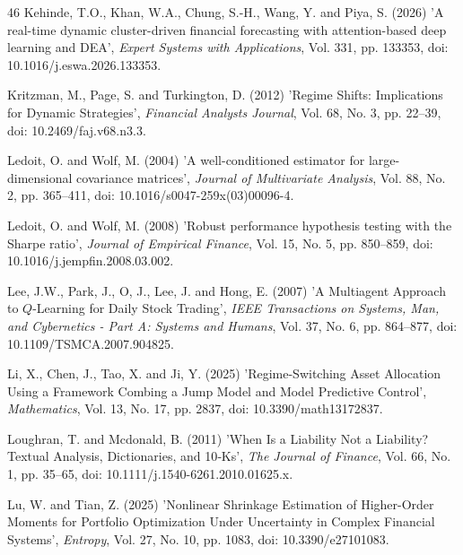 \documentclass{singlecol-new}
\theoremstyle{TH}{
\newtheorem{lemma}{Lemma}
\newtheorem{theorem}[lemma]{Theorem}
\newtheorem{corrolary}[lemma]{Corrolary}
\newtheorem{conjecture}[lemma]{Conjecture}
\newtheorem{proposition}[lemma]{Proposition}
\newtheorem{claim}[lemma]{Claim}
\newtheorem{stheorem}[lemma]{Wrong Theorem}
\newtheorem{algorithm}{Algorithm}
}
\theoremstyle{THrm}{
\newtheorem{definition}{Definition}[section]
\newtheorem{question}{Question}[section]
\newtheorem{remark}{Remark}
\newtheorem{scheme}{Scheme}
}
\theoremstyle{THhit}{
\newtheorem{case}{Case}[section]
}
\begin{document}
\begin{thebibliography}{46}
Kehinde, T.O., Khan, W.A., Chung, S.-H., Wang, Y. and Piya, S. (2026) 'A real-time dynamic cluster-driven financial forecasting with attention-based deep learning and DEA', {\it Expert Systems with Applications}, Vol. 331, pp. 133353, doi: 10.1016/j.eswa.2026.133353.

Kritzman, M., Page, S. and Turkington, D. (2012) 'Regime Shifts: Implications for Dynamic Strategies', {\it Financial Analysts Journal}, Vol. 68, No. 3, pp. 22--39, doi: 10.2469/faj.v68.n3.3.

Ledoit, O. and Wolf, M. (2004) 'A well-conditioned estimator for large-dimensional covariance matrices', {\it Journal of Multivariate Analysis}, Vol. 88, No. 2, pp. 365--411, doi: 10.1016/s0047-259x(03)00096-4.

Ledoit, O. and Wolf, M. (2008) 'Robust performance hypothesis testing with the Sharpe ratio', {\it Journal of Empirical Finance}, Vol. 15, No. 5, pp. 850--859, doi: 10.1016/j.jempfin.2008.03.002.

Lee, J.W., Park, J., O, J., Lee, J. and Hong, E. (2007) 'A Multiagent Approach to $Q$-Learning for Daily Stock Trading', {\it IEEE Transactions on Systems, Man, and Cybernetics - Part A: Systems and Humans}, Vol. 37, No. 6, pp. 864--877, doi: 10.1109/TSMCA.2007.904825.

Li, X., Chen, J., Tao, X. and Ji, Y. (2025) 'Regime-Switching Asset Allocation Using a Framework Combing a Jump Model and Model Predictive Control', {\it Mathematics}, Vol. 13, No. 17, pp. 2837, doi: 10.3390/math13172837.

Loughran, T. and Mcdonald, B. (2011) 'When Is a Liability Not a Liability? Textual Analysis, Dictionaries, and 10‐Ks', {\it The Journal of Finance}, Vol. 66, No. 1, pp. 35--65, doi: 10.1111/j.1540-6261.2010.01625.x.

Lu, W. and Tian, Z. (2025) 'Nonlinear Shrinkage Estimation of Higher-Order Moments for Portfolio Optimization Under Uncertainty in Complex Financial Systems', {\it Entropy}, Vol. 27, No. 10, pp. 1083, doi: 10.3390/e27101083.


\end{thebibliography}
\end{document}
